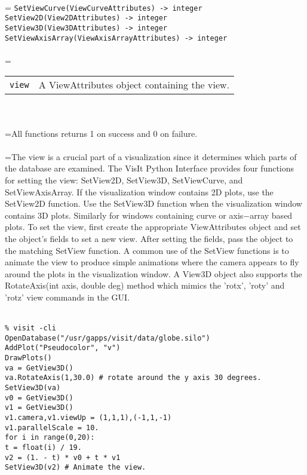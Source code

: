 \documentclass[10pt,a4paper]{report}
\begin{document}
 \\ 
\hangindent=\parindent 
\verb!SetViewCurve(ViewCurveAttributes) -> integer!\\ 
\verb!SetView2D(View2DAttributes) -> integer!\\ 
\verb!SetView3D(View3DAttributes) -> integer!\\ 
\verb!SetViewAxisArray(ViewAxisArrayAttributes) -> integer!\\ [-3mm]

 \\ 
\hangindent=\parindent 
\begin{tabular}{lp{9cm}}
\verb!view! & A ViewAttributes object containing the view. \\
\end{tabular} \\[-2mm]


 \\ 
\hangindent=\parindent All functions returns 1 on success and 0 on failure. \\[-3mm] 

 \\ 
\hangindent=\parindent The view is a crucial part of a visualization since it determines which parts of the database are examined. The VisIt Python Interface provides four functions for setting the view: SetView2D, SetView3D, SetViewCurve, and SetViewAxisArray. If the visualization window contains 2D plots, use the SetView2D function. Use the SetView3D function when the visualization window contains 3D plots.  Similarly for windows containing curve or axis$-$array based plots.  To set the view, first create the appropriate ViewAttributes object and set the object's fields to set a new view. After setting the fields, pass the object to the matching SetView function. A common use of the SetView functions is to animate the view to produce simple animations where the camera appears to fly around the plots in the visualization window. A View3D object also supports the RotateAxis(int axis, double deg) method which mimics the 'rotx', 'roty' and 'rotz' view commands in the GUI. \\[-3mm] 

\\[-6mm]
\begin{verbatim}% visit -cli
OpenDatabase("/usr/gapps/visit/data/globe.silo")
AddPlot("Pseudocolor", "v")
DrawPlots()
va = GetView3D()
va.RotateAxis(1,30.0) # rotate around the y axis 30 degrees.
SetView3D(va)
v0 = GetView3D()
v1 = GetView3D()
v1.camera,v1.viewUp = (1,1,1),(-1,1,-1)
v1.parallelScale = 10.
for i in range(0,20):
t = float(i) / 19.
v2 = (1. - t) * v0 + t * v1
SetView3D(v2) # Animate the view.
\end{verbatim}
\newpage
\end{document}
